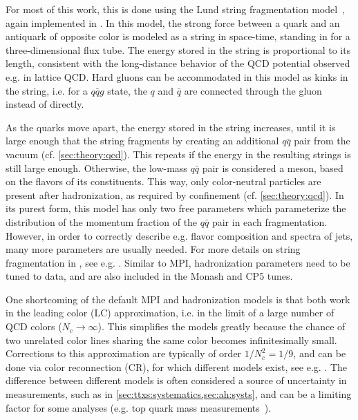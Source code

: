 For most of this work, this is done using the Lund string fragmentation model~\cite{Andersson:1983ia,Sjostrand:1984ic}, again implemented in \pythia. In this model, the strong force between a quark and an antiquark of opposite color is modeled as a string in space-time, standing in for a three-dimensional flux tube. The energy stored in the string is proportional to its length, consistent with the long-distance behavior of the QCD potential observed e.g. in lattice QCD. Hard gluons can be accommodated in this model as kinks in the string, i.e. for a $q\bar{q}g$ state, the $q$ and $\bar{q}$ are connected through the gluon instead of directly.

As the quarks move apart, the energy stored in the string increases, until it is large enough that the string fragments by creating an additional $q\bar{q}$ pair from the vacuum (cf. \cref{sec:theory:qcd}). This repeats if the energy in the resulting strings is still large enough. Otherwise, the low-mass $q\bar{q}$ pair is considered a meson, based on the flavors of its constituents. This way, only color-neutral particles are present after hadronization, as required by confinement (cf. \cref{sec:theory:qcd}). In its purest form, this model has only two free parameters which parameterize the distribution of the momentum fraction of the $q\bar{q}$ pair in each fragmentation. However, in order to correctly describe e.g. flavor composition and \pt spectra of jets, many more parameters are usually needed. For more details on string fragmentation in \pythia, see e.g. . Similar to MPI, hadronization parameters need to be tuned to data, and are also included in the Monash and CP5 tunes.

One shortcoming of the default MPI and hadronization models is that both work in the leading color (LC) approximation, i.e. in the limit of a large number of QCD colors ($N_c \rightarrow \infty$). This simplifies the models greatly because the chance of two unrelated color lines sharing the same color becomes infinitesimally small. Corrections to this approximation are typically of order $1/N_c^2 = 1/9$, and can be done via color reconnection (CR), for which different models exist, see e.g. . The difference between different models is often considered a source of uncertainty in measurements, such as in \cref{sec:ttxs:systematics,sec:ah:systs}, and can be a limiting factor for some analyses (e.g. top quark mass measurements~\cite{CMS:TOP-20-008,ATLAS:2025bpp}).

